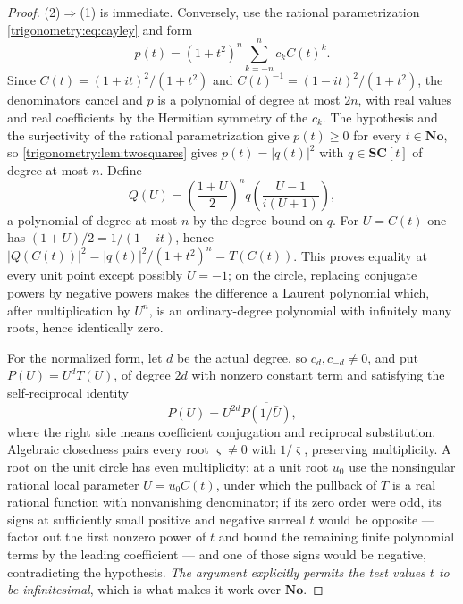 \documentclass[11pt,letterpaper]{article}
\numberwithin{equation}{section}
\theoremstyle{definition}
\theoremstyle{remark}
\newcommand{\No}{\mathbf{No}}
\newcommand{\SC}{\mathbf{SC}}
\begin{document}
\begin{proof}
(2)$\Rightarrow$(1) is immediate. Conversely, use the rational parametrization
\cref{trigonometry:eq:cayley} and form
\begin{equation}\label{trigonometry:eq:cayleypositive}
 p(t)=(1+t^2)^n\sum_{k=-n}^nc_kC(t)^k .
\end{equation}
Since $C(t)=(1+it)^2/(1+t^2)$ and $C(t)^{-1}=(1-it)^2/(1+t^2)$, the denominators cancel and $p$ is
a polynomial of degree at most $2n$, with real values and real coefficients by the Hermitian
symmetry of the $c_k$. The hypothesis and the surjectivity of the rational parametrization give
$p(t)\ge0$ for every $t\in\No$, so \cref{trigonometry:lem:twosquares} gives $p(t)=|q(t)|^2$ with
$q\in\SC[t]$ of degree at most $n$. Define
\begin{equation}\label{trigonometry:eq:fejerconstruction}
 Q(U)=\left(\frac{1+U}2\right)^nq\!\left(\frac{U-1}{i(U+1)}\right),
\end{equation}
a polynomial of degree at most $n$ by the degree bound on $q$. For $U=C(t)$ one has
$(1+U)/2=1/(1-it)$, hence $|Q(C(t))|^2=|q(t)|^2/(1+t^2)^n=T(C(t))$. This proves equality at every
unit point except possibly $U=-1$; on the circle, replacing conjugate powers by negative powers
makes the difference a Laurent polynomial which, after multiplication by $U^n$, is an
ordinary-degree polynomial with infinitely many roots, hence identically zero.

For the normalized form, let $d$ be the actual degree, so $c_d,c_{-d}\ne0$, and put $P(U)=U^dT(U)$,
of degree $2d$ with nonzero constant term and satisfying the self-reciprocal identity
\begin{equation}\label{trigonometry:eq:selfreciprocal}
 P(U)=U^{2d}\overline{P(1/\bar U)},
\end{equation}
where the right side means coefficient conjugation and reciprocal substitution. Algebraic
closedness pairs every root $\varsigma\ne0$ with $1/\bar\varsigma$, preserving multiplicity. A root
on the unit circle has even multiplicity: at a unit root $u_0$ use the nonsingular rational local
parameter $U=u_0C(t)$, under which the pullback of $T$ is a real rational function with nonvanishing
denominator; if its zero order were odd, its signs at sufficiently small positive and negative
surreal $t$ would be opposite --- factor out the first nonzero power of $t$ and bound the remaining
finite polynomial terms by the leading coefficient --- and one of those signs would be negative,
contradicting the hypothesis. \emph{The argument explicitly permits the test values $t$ to be
infinitesimal}, which is what makes it work over $\No$.


\end{proof}
\end{document}
